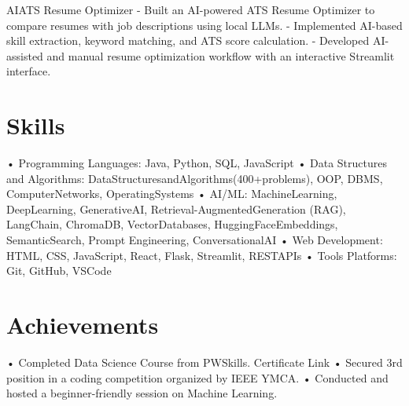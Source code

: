 \documentclass[11pt,a4paper]{article}
\begin{document}
AIATS Resume Optimizer
- Built an AI-powered ATS Resume Optimizer to compare resumes with job descriptions using local LLMs.
- Implemented AI-based skill extraction, keyword matching, and ATS score calculation.
- Developed AI-assisted and manual resume optimization workflow with an interactive Streamlit interface.



\section*{Skills}

• Programming Languages: Java, Python, SQL, JavaScript
• Data Structures and Algorithms: DataStructuresandAlgorithms(400+problems), OOP, DBMS, ComputerNetworks, OperatingSystems
• AI/ML: MachineLearning, DeepLearning, GenerativeAI, Retrieval-AugmentedGeneration (RAG), LangChain, ChromaDB, VectorDatabases, HuggingFaceEmbeddings, SemanticSearch, Prompt Engineering, ConversationalAI
• Web Development: HTML, CSS, JavaScript, React, Flask, Streamlit, RESTAPIs
• Tools Platforms: Git, GitHub, VSCode



\section*{Achievements}

• Completed Data Science Course from PWSkills. Certificate Link
• Secured 3rd position in a coding competition organized by IEEE YMCA.
• Conducted and hosted a beginner-friendly session on Machine Learning.
\end{document}
